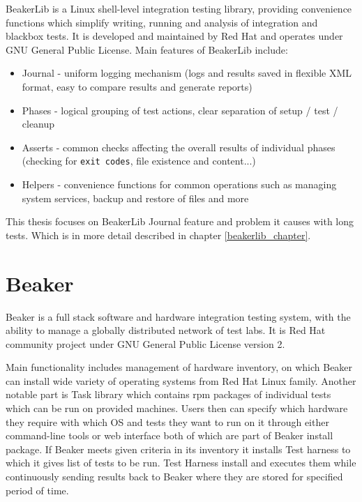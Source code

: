 BeakerLib is a Linux shell-level integration testing library, providing convenience functions which simplify writing, running and analysis of integration and blackbox tests. \cite{beakerlib_wiki}
It is developed and maintained by Red Hat and operates under GNU General Public License.
Main features of BeakerLib include:
\begin{itemize}
\item Journal - uniform logging mechanism (logs and results saved in flexible XML format, easy to compare results and generate reports)
\item Phases - logical grouping of test actions, clear separation of setup / test / cleanup
\item Asserts - common checks affecting the overall results of individual phases (checking for \texttt{exit codes}, file existence and content...)
\item Helpers - convenience functions for common operations such as managing system services, backup and restore of files and more
\end{itemize}


This thesis focuses on BeakerLib Journal feature and problem it causes with long tests. Which is in more detail described in chapter \ref{beakerlib_chapter}.


\section{Beaker}

Beaker\cite{beaker_doc} is a full stack software and hardware integration testing system, with the ability to manage a globally distributed network of test labs.  It is Red Hat community project under GNU General Public License version 2.

Main functionality includes management of hardware inventory, on which Beaker can install wide variety  of operating systems from Red Hat Linux family. Another notable part  is Task library which contains rpm packages of individual tests which can be run on provided machines. 
Users then can specify which hardware they require with which OS and tests they want to run on it through either command-line tools or web interface both of which are part of Beaker install package. If Beaker meets given criteria in its inventory it installs Test harness to which it gives list of tests to be run.  Test Harness install and executes them while continuously sending results back to Beaker where they are stored for specified period of time. 

